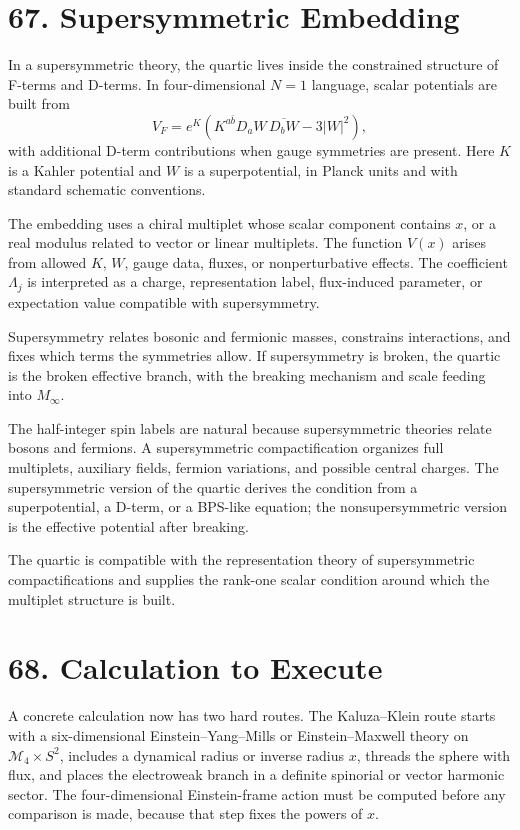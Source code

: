 \documentclass[11pt]{article}
\newcommand{\Lspin}{\Lambda_j}
\begin{document}
\section*{67. Supersymmetric Embedding}

In a supersymmetric theory, the quartic lives inside the constrained structure of F-terms and D-terms. In four-dimensional \(N=1\) language, scalar potentials are built from
\[
        V_F=e^K\left(K^{a\bar b}D_aW\,\overline{D_bW}-3|W|^2\right),
\]
with additional D-term contributions when gauge symmetries are present. Here \(K\) is a Kahler potential and \(W\) is a superpotential, in Planck units and with standard schematic conventions.

The embedding uses a chiral multiplet whose scalar component contains \(x\), or a real modulus related to vector or linear multiplets. The function \(V(x)\) arises from allowed \(K\), \(W\), gauge data, fluxes, or nonperturbative effects. The coefficient \(\Lspin\) is interpreted as a charge, representation label, flux-induced parameter, or expectation value compatible with supersymmetry.

Supersymmetry relates bosonic and fermionic masses, constrains interactions, and fixes which terms the symmetries allow. If supersymmetry is broken, the quartic is the broken effective branch, with the breaking mechanism and scale feeding into \(M_\infty\).

The half-integer spin labels are natural because supersymmetric theories relate bosons and fermions. A supersymmetric compactification organizes full multiplets, auxiliary fields, fermion variations, and possible central charges. The supersymmetric version of the quartic derives the condition from a superpotential, a D-term, or a BPS-like equation; the nonsupersymmetric version is the effective potential after breaking.

The quartic is compatible with the representation theory of supersymmetric compactifications and supplies the rank-one scalar condition around which the multiplet structure is built.

\section*{68. Calculation to Execute}

A concrete calculation now has two hard routes. The Kaluza--Klein route starts with a six-dimensional Einstein--Yang--Mills or Einstein--Maxwell theory on \(\mathcal{M}_4\times S^2\), includes a dynamical radius or inverse radius \(x\), threads the sphere with flux, and places the electroweak branch in a definite spinorial or vector harmonic sector. The four-dimensional Einstein-frame action must be computed before any comparison is made, because that step fixes the powers of \(x\).
\end{document}
